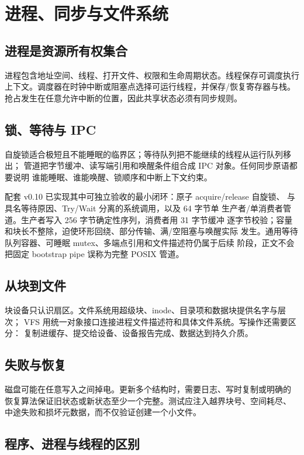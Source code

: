 \section{进程、同步与文件系统}

\subsection{进程是资源所有权集合}

进程包含地址空间、线程、打开文件、权限和生命周期状态。线程保存可调度执行
上下文。调度器在时钟中断或阻塞点选择可运行线程，并保存/恢复寄存器与栈。
抢占发生在任意允许中断的位置，因此共享状态必须有同步规则。

\subsection{锁、等待与 IPC}

自旋锁适合极短且不能睡眠的临界区；等待队列把不能继续的线程从运行队列移出；
管道把字节缓冲、读写端引用和唤醒条件组合成 IPC 对象。任何同步原语都要说明
谁能睡眠、谁能唤醒、锁顺序和中断上下文约束。

配套 v0.10 已实现其中可独立验收的最小闭环：原子 acquire/release 自旋锁、
 与具名等待原因、Try/Wait 分离的系统调用，以及 64 字节单
生产者/单消费者管道。生产者写入 256 字节确定性序列，消费者用 31 字节缓冲
逐字节校验；容量和块长不整除，迫使环形回绕、部分传输、满/空阻塞与唤醒实际
发生。通用等待队列容器、可睡眠 mutex、多端点引用和文件描述符仍属于后续
阶段，正文不会把固定 bootstrap pipe 误称为完整 POSIX 管道。

\subsection{从块到文件}

块设备只认识扇区。文件系统用超级块、inode、目录项和数据块提供名字与层次；
VFS 用统一对象接口连接进程文件描述符和具体文件系统。写操作还需要区分：
复制进缓存、提交给设备、设备报告完成、数据达到持久介质。

\subsection{失败与恢复}

磁盘可能在任意写入之间掉电。更新多个结构时，需要日志、写时复制或明确的
恢复算法保证旧状态或新状态至少一个完整。测试应注入越界块号、空间耗尽、
中途失败和损坏元数据，而不仅验证创建一个小文件。

\subsection{程序、进程与线程的区别}

